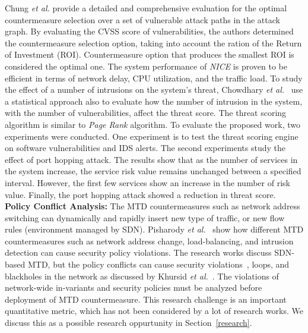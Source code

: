 Chung \textit{et al.}  provide a detailed and comprehensive evaluation for the optimal countermeasure selection over a set of vulnerable attack paths in the attack graph. By evaluating the CVSS score of vulnerabilities, the authors determined the countermeasure selection option, taking into account the ration of the {Return of Investment} (ROI). Countermeasure option that produces the smallest ROI is considered the optimal one. The system performance of \textit{NICE}  is proven to be efficient in terms of network delay, CPU utilization, and the traffic load. 
To study the effect of a number of intrusions on the system's threat, Chowdhary \textit{et al.}~ use a {statistical approach} also to evaluate how the number of intrusion in the system, with the number of vulnerabilities, affect the threat score. The threat scoring algorithm is similar to \textit{Page Rank} algorithm. To evaluate the proposed work, two experiments were conducted. One experiment is to test the threat scoring engine on {software vulnerabilities} and {IDS alerts}. The second experiments study the {effect} of {port hopping} attack. The results show that as the number of services in the system increase, the service risk value remains unchanged between a specified interval. However, the first few services show an increase in the number of risk value. Finally, the port hopping attack showed a reduction in threat score. 
\textbf{Policy Conflict Analysis:} The MTD countermeasures such as network address switching can dynamically and rapidly insert new type of traffic, or new {flow rules} (environment managed by SDN). Pisharody \textit{et al.}~ show how different MTD countermeasures such as {network address} change, {load-balancing}, and {intrusion detection} can cause {security policy violations}. The research works discuss {SDN-based MTD}, but the {policy conflicts} can cause {security violations}~, {loops}, and {blackholes} in the network as discussed by Khursid \textit{et al.}~. The violations of {network-wide} in-variants and {security policies} must be analyzed before deployment of MTD countermeasure. This research challenge is an important {quantitative metric}, which has not been considered by a lot of research works. We discuss this as a possible {research oppurtunity} in Section~\ref{research}. 


